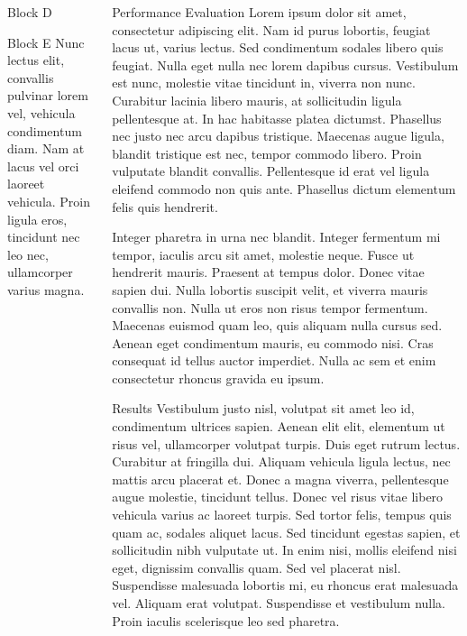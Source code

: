 \documentclass{beamer}
\begin{document}
\begin{frame}
\begin{columns}[t]
\begin{column}{.3\paperwidth}
\begin{block}{Block D}
		\end{block}
		\vfill
		\begin{block}{Block E}
			Nunc lectus elit, convallis pulvinar lorem vel, vehicula condimentum diam. Nam at lacus vel orci laoreet vehicula. Proin ligula eros, tincidunt nec leo nec, ullamcorper varius magna. 
		\end{block}
	\end{column}
		
	\begin{column}{.3\paperwidth}
		\begin{block}{Performance Evaluation}
			 Lorem ipsum dolor sit amet, consectetur adipiscing elit. Nam id purus lobortis, feugiat lacus ut, varius lectus. Sed condimentum sodales libero quis feugiat. Nulla eget nulla nec lorem dapibus cursus. Vestibulum est nunc, molestie vitae tincidunt in, viverra non nunc. Curabitur lacinia libero mauris, at sollicitudin ligula pellentesque at. In hac habitasse platea dictumst. Phasellus nec justo nec arcu dapibus tristique. Maecenas augue ligula, blandit tristique est nec, tempor commodo libero. Proin vulputate blandit convallis. Pellentesque id erat vel ligula eleifend commodo non quis ante. Phasellus dictum elementum felis quis hendrerit.

			Integer pharetra in urna nec blandit. Integer fermentum mi tempor, iaculis arcu sit amet, molestie neque. Fusce ut hendrerit mauris. Praesent at tempus dolor. Donec vitae sapien dui. Nulla lobortis suscipit velit, et viverra mauris convallis non. Nulla ut eros non risus tempor fermentum. Maecenas euismod quam leo, quis aliquam nulla cursus sed. Aenean eget condimentum mauris, eu commodo nisi. Cras consequat id tellus auctor imperdiet. Nulla ac sem et enim consectetur rhoncus gravida eu ipsum. 
		\end{block}
		\vfill
		\baselineskip %
		\begin{block}{Results}
			 Vestibulum justo nisl, volutpat sit amet leo id, condimentum ultrices sapien. Aenean elit elit, elementum ut risus vel, ullamcorper volutpat turpis. Duis eget rutrum lectus. Curabitur at fringilla dui. Aliquam vehicula ligula lectus, nec mattis arcu placerat et. Donec a magna viverra, pellentesque augue molestie, tincidunt tellus. Donec vel risus vitae libero vehicula varius ac laoreet turpis. Sed tortor felis, tempus quis quam ac, sodales aliquet lacus. Sed tincidunt egestas sapien, et sollicitudin nibh vulputate ut. In enim nisi, mollis eleifend nisi eget, dignissim convallis quam. Sed vel placerat nisl. Suspendisse malesuada lobortis mi, eu rhoncus erat malesuada vel. Aliquam erat volutpat. Suspendisse et vestibulum nulla. Proin iaculis scelerisque leo sed pharetra.
			

\end{block}
\end{column}
\end{columns}
\end{frame}
\end{document}
